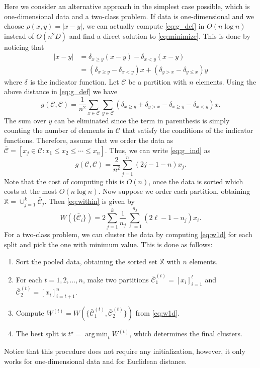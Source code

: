 \documentclass{article}
\DeclareMathOperator*{\argmin}{arg\,min}
\newcommand\C{{\mathcal{C}}}
\newcommand{\Ind}[1]{\delta_{#1}}
\begin{document}
Here we consider an alternative approach in the simplest case possible, which
is one-dimensional data and a two-class problem.
If data is one-dimensional and we choose
$\rho(x,y) = |x - y|$, we can actually compute 
\eqref{eq:g_def} in $O(n \log n)$ instead of $O(n^2 D)$ and find
a direct solution to \eqref{eq:minimize}. 
This is done by noticing that
\begin{equation}
\begin{aligned}
|x - y|  &= \Ind{x \ge y} (x - y) -
\Ind{x < y} (x - y) \\
&= 
\left( \Ind{x \ge y} - \Ind{x < y} \right) x + 
\left( \Ind{y > x} - \Ind{y \le x} \right) y
\end{aligned}
\end{equation}
where $\Ind{}$ is the indicator function.
Let $\C$ be a partition with
$n$ elements. Using the above distance in \eqref{eq:g_def} we have
\begin{equation}
\label{eq:g_ind}
g(\C,\C) = \dfrac{1}{n^2} \sum_{x \in \C} 
\sum_{y \in \C} 
\left(
\Ind{x \ge y} + \Ind{y > x} - 
\Ind{x \ge y}-\Ind{x < y} \right) x.
\end{equation}
The sum over $y$ can be eliminated since the term in
parenthesis is simply counting the number of elements in $\C$ that satisfy
the conditions of the indicator functions. Therefore, assume
that we order the data as 
$\bar{\C} = [ x_j \in \C: x_1 \le x_2 \le \dotsm \le x_{n}]$. Thus, we
can write \eqref{eq:g_ind} as
\begin{equation}
\label{eq:g1d}
g(\C, \C) = \dfrac{2}{n^2} \sum_{j=1}^n (2j - 1 - n) x_j .
\end{equation}
Note that the cost of computing this is $O(n)$, once the data
is sorted which costs at the most $O(n\log n)$.
Now suppose we order each partition, obtaining $\mathbb{X} = \cup_{j=1}^k
\bar{\C}_j$. Then \eqref{eq:within} is given by
\begin{equation}
\label{eq:w1d}
W(\{ \bar{\C}_i \}) = 2
\sum_{j=1}^k \dfrac{1}{n_j} \sum_{\ell=1}^{n_j} (2\ell - 1 - n_j) x_\ell.
\end{equation}
For a two-class problem, we can cluster the data by computing \eqref{eq:w1d}
for each split and pick the one with minimum value. This is done
as follows:
\begin{enumerate}
\item Sort the pooled data, obtaining the sorted set $\bar{\mathbb{X}}$ with
$n$ elements.
\item For each $t=1,2,\dotsc,n$, make two partitions 
$\bar{\C}_1^{(t)} = [x_i]_{i=1}^t$ and 
$\bar{\C}_2^{(t)} = [x_i]_{i=t+1}^n$. 
\item Compute $W^{(t)} = W(\{ \bar{\C}_1^{(t)},\bar{\C}_2^{(t)}  \})$ 
from \eqref{eq:w1d}.
\item The best split is $t^\star = \argmin_t W^{(t)}$, which
determines the final clusters.
\end{enumerate}
Notice that this procedure does not require any initialization, however,
it only works for one-dimensional data and for Euclidean distance.
\end{document}
